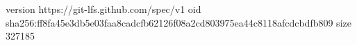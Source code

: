 version https://git-lfs.github.com/spec/v1
oid sha256:ff8fa45e3db5e03faa8cadcfb62126f08a2cd803975ea44c8118afcdcbdfb809
size 327185
